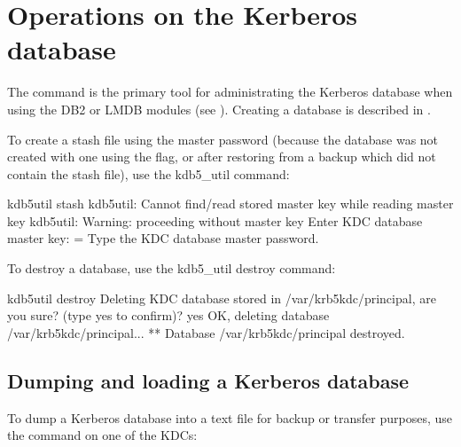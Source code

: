 \documentclass[letterpaper,10pt,english]{sphinxmanual}
\begin{document}
\section{Operations on the Kerberos database}
\label{\detokenize{admin/database:db-operations}}\label{\detokenize{admin/database:operations-on-the-kerberos-database}}
The {\hyperref[\detokenize{admin/admin_commands/kdb5_util:kdb5-util-8}]{}} command is the primary tool for administrating
the Kerberos database when using the DB2 or LMDB modules (see
{\hyperref[\detokenize{admin/dbtypes:dbtypes}]{}}).  Creating a database is described in
{\hyperref[\detokenize{admin/install_kdc:create-db}]{}}.

To create a stash file using the master password (because the database
was not created with one using the  flag, or after
restoring from a backup which did not contain the stash file), use the
kdb5\_util  command:

%
\begin{sphinxVerbatim}[commandchars=\\\{\}]
\PYGZdl{} kdb5\PYGZus{}util stash
kdb5\PYGZus{}util: Cannot find/read stored master key while reading master key
kdb5\PYGZus{}util: Warning: proceeding without master key
Enter KDC database master key:  \PYGZlt{}= Type the KDC database master password.
\end{sphinxVerbatim}

To destroy a database, use the kdb5\_util destroy command:

%
\begin{sphinxVerbatim}[commandchars=\\\{\}]
\PYGZdl{} kdb5\PYGZus{}util destroy
Deleting KDC database stored in \PYGZsq{}/var/krb5kdc/principal\PYGZsq{}, are you sure?
(type \PYGZsq{}yes\PYGZsq{} to confirm)? yes
OK, deleting database \PYGZsq{}/var/krb5kdc/principal\PYGZsq{}...
** Database \PYGZsq{}/var/krb5kdc/principal\PYGZsq{} destroyed.
\end{sphinxVerbatim}


\subsection{Dumping and loading a Kerberos database}
\label{\detokenize{admin/database:dumping-and-loading-a-kerberos-database}}\label{\detokenize{admin/database:restore-from-dump}}
To dump a Kerberos database into a text file for backup or transfer
purposes, use the {\hyperref[\detokenize{admin/admin_commands/kdb5_util:kdb5-util-8}]{}}  command on one of the
KDCs:
\end{document}
